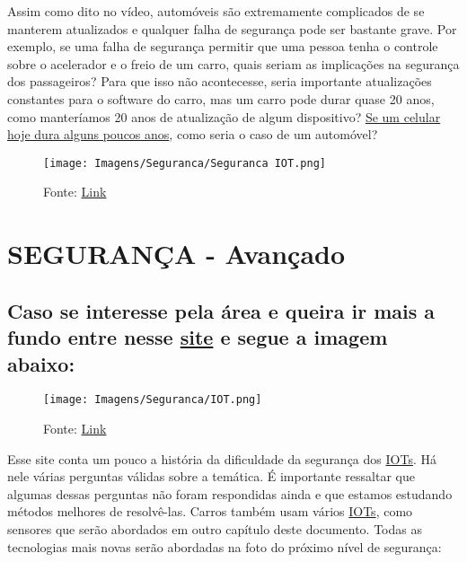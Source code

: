 \documentclass{article}
\begin{document}
Assim como dito no vídeo, automóveis são extremamente complicados de se manterem atualizados e qualquer falha de segurança pode ser bastante grave. Por exemplo, se uma falha de segurança permitir que uma pessoa tenha o controle sobre o acelerador e o freio de um carro, quais seriam as implicações na segurança dos passageiros? Para que isso não acontecesse, seria importante atualizações constantes para o software do carro, mas um carro pode durar quase 20 anos, como manteríamos 20 anos de atualização de algum dispositivo? \href{https://baratodecelular.com.br/sac-0800/quanto-tempo-dura-um-celular-android/}{Se um celular hoje dura alguns poucos anos}, como seria o caso de um automóvel?


\begin{figure}[ht]
    \centering
    \texttt{[image: Imagens/Seguranca/Seguranca IOT.png]}
    \caption{Fonte: \href{https://bics.com/iot-safe-robust-iot-security-at-scale/}{Link}}
\end{figure}


\newpage

\section*{SEGURANÇA - Avançado}

\subsection*{Caso se interesse pela área e queira ir mais a fundo entre nesse \href{https://bluepex.com.br/industria-iot/}{site} e segue a imagem abaixo:}


\begin{figure}[ht]
    \centering
    \texttt{[image: Imagens/Seguranca/IOT.png]}
    \caption{Fonte: \href{https://bluepex.com.br/industria-iot/}{Link}}
\end{figure}


Esse site conta um pouco a história da dificuldade da segurança dos \href{https://pt.wikipedia.org/wiki/Internet_das_coisas#Privacidade_e_seguran%C3%A7a}{IOTs}. Há nele várias perguntas válidas sobre a temática. É importante ressaltar que algumas dessas perguntas não foram respondidas ainda e que estamos estudando métodos melhores de resolvê-las. Carros também usam vários \href{https://pt.wikipedia.org/wiki/Internet_das_coisas#Arduino_e_a_Internet_das_coisas}{IOTs}, como sensores que serão abordados em outro capítulo deste documento. Todas as tecnologias mais novas serão abordadas na foto do próximo nível de segurança:
\end{document}
